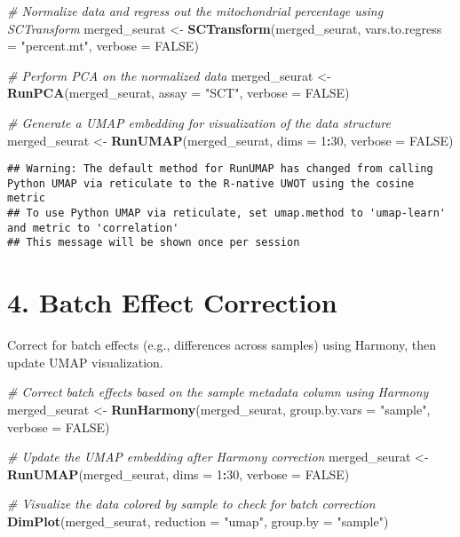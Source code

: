 \documentclass[
]{article}
\newenvironment{Shaded}{\begin{snugshade}}{\end{snugshade}}
\newcommand{\AttributeTok}[1]{\textcolor[rgb]{0.13,0.29,0.53}{#1}}
\newcommand{\CommentTok}[1]{\textcolor[rgb]{0.56,0.35,0.01}{\textit{#1}}}
\newcommand{\ConstantTok}[1]{\textcolor[rgb]{0.56,0.35,0.01}{#1}}
\newcommand{\DecValTok}[1]{\textcolor[rgb]{0.00,0.00,0.81}{#1}}
\newcommand{\FunctionTok}[1]{\textcolor[rgb]{0.13,0.29,0.53}{\textbf{#1}}}
\newcommand{\NormalTok}[1]{#1}
\newcommand{\OtherTok}[1]{\textcolor[rgb]{0.56,0.35,0.01}{#1}}
\newcommand{\SpecialCharTok}[1]{\textcolor[rgb]{0.81,0.36,0.00}{\textbf{#1}}}
\newcommand{\StringTok}[1]{\textcolor[rgb]{0.31,0.60,0.02}{#1}}
\begin{document}
\begin{Shaded}
\begin{Highlighting}[]
\CommentTok{\# Normalize data and regress out the mitochondrial percentage using SCTransform}
\NormalTok{merged\_seurat }\OtherTok{\textless{}{-}} \FunctionTok{SCTransform}\NormalTok{(merged\_seurat, }\AttributeTok{vars.to.regress =} \StringTok{"percent.mt"}\NormalTok{, }\AttributeTok{verbose =} \ConstantTok{FALSE}\NormalTok{)}

\CommentTok{\# Perform PCA on the normalized data}
\NormalTok{merged\_seurat }\OtherTok{\textless{}{-}} \FunctionTok{RunPCA}\NormalTok{(merged\_seurat, }\AttributeTok{assay =} \StringTok{"SCT"}\NormalTok{, }\AttributeTok{verbose =} \ConstantTok{FALSE}\NormalTok{)}

\CommentTok{\# Generate a UMAP embedding for visualization of the data structure}
\NormalTok{merged\_seurat }\OtherTok{\textless{}{-}} \FunctionTok{RunUMAP}\NormalTok{(merged\_seurat, }\AttributeTok{dims =} \DecValTok{1}\SpecialCharTok{:}\DecValTok{30}\NormalTok{, }\AttributeTok{verbose =} \ConstantTok{FALSE}\NormalTok{)}
\end{Highlighting}
\end{Shaded}

\begin{verbatim}
## Warning: The default method for RunUMAP has changed from calling Python UMAP via reticulate to the R-native UWOT using the cosine metric
## To use Python UMAP via reticulate, set umap.method to 'umap-learn' and metric to 'correlation'
## This message will be shown once per session
\end{verbatim}

\section{4. Batch Effect Correction}\label{batch-effect-correction}

Correct for batch effects (e.g., differences across samples) using
Harmony, then update UMAP visualization.

\begin{Shaded}
\begin{Highlighting}[]
\CommentTok{\# Correct batch effects based on the \textquotesingle{}sample\textquotesingle{} metadata column using Harmony}
\NormalTok{merged\_seurat }\OtherTok{\textless{}{-}} \FunctionTok{RunHarmony}\NormalTok{(merged\_seurat, }\AttributeTok{group.by.vars =} \StringTok{"sample"}\NormalTok{, }\AttributeTok{verbose =} \ConstantTok{FALSE}\NormalTok{)}

\CommentTok{\# Update the UMAP embedding after Harmony correction}
\NormalTok{merged\_seurat }\OtherTok{\textless{}{-}} \FunctionTok{RunUMAP}\NormalTok{(merged\_seurat, }\AttributeTok{dims =} \DecValTok{1}\SpecialCharTok{:}\DecValTok{30}\NormalTok{, }\AttributeTok{verbose =} \ConstantTok{FALSE}\NormalTok{)}

\CommentTok{\# Visualize the data colored by sample to check for batch correction}
\FunctionTok{DimPlot}\NormalTok{(merged\_seurat, }\AttributeTok{reduction =} \StringTok{"umap"}\NormalTok{, }\AttributeTok{group.by =} \StringTok{"sample"}\NormalTok{)}
\end{Highlighting}
\end{Shaded}
\end{document}
